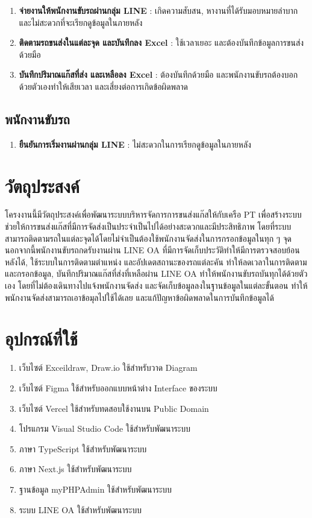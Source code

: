 \begin{enumerate}
    \item \textbf{จ่ายงานให้พนักงานขับรถผ่านกลุ่ม LINE} : เกิดความสับสน, หางานที่ได้รับมอบหมายลำบาก และไม่สะดวกที่จะเรียกดูข้อมูลในภายหลัง
    \item \textbf{ติดตามรถขนส่งในแต่ละจุด และบันทึกลง Excel} : ใช้เวลาเยอะ และต้องบันทึกข้อมูลการขนส่งด้วยมือ
    \item \textbf{บันทึกปริมาณแก๊สที่ส่ง และเหลือลง Excel} : ต้องบันทึกด้วยมือ และพนักงานขับรถต้องบอกด้วยตัวเองทำให้เสียเวลา และเสี่ยงต่อการเกิดข้อผิดพลาด
\end{enumerate}

\subsection{พนักงานขับรถ}

\begin{enumerate}
    \item \textbf{ยืนยันการเริ่มงานผ่านกลุ่ม LINE} : ไม่สะดวกในการเรียกดูข้อมูลในภายหลัง
\end{enumerate}

\section{วัตถุประสงค์}
    โครงงานนี้มีวัตถุประสงค์เพื่อพัฒนาระบบบริหารจัดการการขนส่งแก๊สให้กับเครือ PT เพื่อสร้างระบบช่วยให้การขนส่งแก๊สที่มีการจัดส่งเป็นประจำเป็นไปได้อย่างสะดวกและมีประสิทธิภาพ โดยที่ระบบสามารถติดตามรถในแต่ละจุดได้โดยไม่จำเป็นต้องใช้พนักงานจัดส่งในการกรอกข้อมูลในทุก ๆ จุด นอกจากนี้พนักงานขับรถกดรับงานผ่าน LINE OA ที่มีการจัดเก็บประวัติทำให้มีการตรวจสอบย้อนหลังได้, ใช้ระบบในการติดตามตำแหน่ง และอัปเดตสถานะของรถแต่ละคัน ทำให้ลดเวลาในการติดตาม และกรอกข้อมูล, บันทึกปริมาณแก๊สที่ส่งที่เหลือผ่าน LINE OA ทำให้พนักงานขับรถบันทุกได้ด้วยตัวเอง โดยที่ไม่ต้องเดินทางไปแจ้งพนักงานจัดส่ง และจัดเก็บข้อมูลลงในฐานข้อมูลในแต่ละขั้นตอน ทำให้พนักงานจัดส่งสามารถเอาข้อมุลไปใช้ได้เลย และแก้ปัญหาข้อผิดพลาดในการบันทึกข้อมูลได้

\section{อุปกรณ์ที่ใช้}
\begin{enumerate}
    \item เว็บไซต์ Exceildraw, Draw.io ใช้สำหรับวาด Diagram
    \item เว็บไซต์ Figma ใช้สำหรับออกแบบหน้าต่าง Interface ของระบบ
    \item เว็บไซต์ Vercel ใช้สำหรับทดสอบใช้งานบน Public Domain
    \item โปรแกรม Visual Studio Code ใช้สำหรับพัฒนาระบบ
    \item ภาษา TypeScript ใช้สำหรับพัฒนาระบบ
    \item ภาษา Next.js ใช้สำหรับพัฒนาระบบ
    \item ฐานข้อมูล myPHPAdmin ใช้สำหรับพัฒนาระบบ
    \item ระบบ LINE OA ใช้สำหรับพัฒนาระบบ
\end{enumerate}

